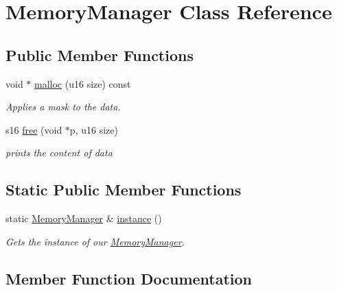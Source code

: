 \hypertarget{class_memory_manager}{}\section{Memory\+Manager Class Reference}
\label{class_memory_manager}
\subsection*{Public Member Functions}
\begin{DoxyCompactItemize}
\item 
void $\ast$ \hyperlink{class_memory_manager_abad4b4e43287ee7446b80090abe339df}{malloc} (u16 size) const
\begin{DoxyCompactList}\small\item\em Applies a mask to the data. \end{DoxyCompactList}\item 
s16 \hyperlink{class_memory_manager_a566751311698bea523100cf911701fe3}{free} (void $\ast$p, u16 size)
\begin{DoxyCompactList}\small\item\em prints the content of data \end{DoxyCompactList}\end{DoxyCompactItemize}
\subsection*{Static Public Member Functions}
\begin{DoxyCompactItemize}
\item 
static \hyperlink{class_memory_manager}{Memory\+Manager} \& \hyperlink{class_memory_manager_aca47d9c82aaf9978968a3e6ac9216e79}{instance} ()
\begin{DoxyCompactList}\small\item\em Gets the instance of our \hyperlink{class_memory_manager}{Memory\+Manager}. \end{DoxyCompactList}\end{DoxyCompactItemize}


\subsection{Member Function Documentation}
\mbox{\label{class_memory_manager_a566751311698bea523100cf911701fe3}} 
